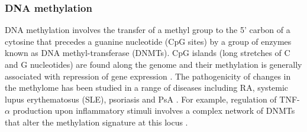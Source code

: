 \subsubsection{DNA methylation}
DNA methylation involves the transfer of a methyl group to the 5' carbon of a cytosine that precedes a guanine nucleotide (CpG sites) by a group of enzymes known as DNA methyl-transferase (DNMTs). CpG islands (long stretches of C and G nucleotides) are found along the genome and their methylation is generally associated with repression of gene expression \parencite{Herman2003}. %
The pathogenicity of changes in the methylome has been studied in a range of diseases including RA, systemic lupus erythematosus (SLE), psoriasis and PsA \parencite{Lei2009,Liu2013,Zhang2010}. For example, regulation of TNF-$\alpha$ production upon inflammatory stimuli involves a complex network of DNMTs that alter the methylation signature at this locus \parencite{Sullivan2007}. %


